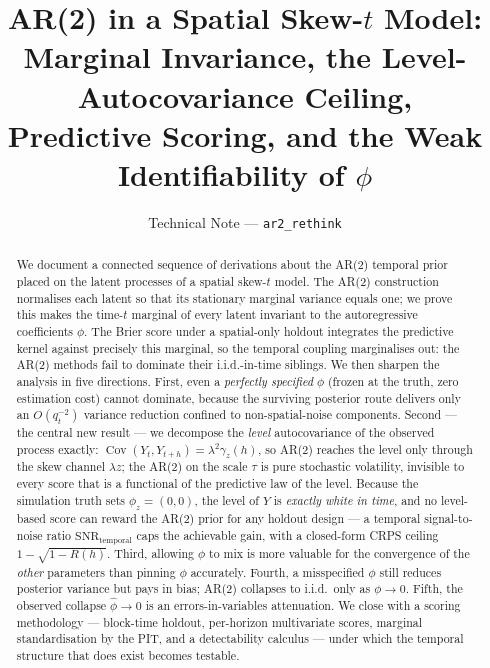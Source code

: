\documentclass[11pt]{article}
\title{
  AR(2) in a Spatial Skew-$t$ Model:\\
  Marginal Invariance, the Level-Autocovariance Ceiling,\\
  Predictive Scoring, and the Weak Identifiability of $\phi$
}
\author{Technical Note --- \texttt{ar2\_rethink}}
\date{}
\theoremstyle{definition}
\newcommand{\Cov}{\operatorname{Cov}}
\newcommand{\SNR}{\mathrm{SNR}_{\mathrm{temporal}}}
\begin{document}
\maketitle

\begin{abstract}
We document a connected sequence of derivations about the AR(2)
temporal prior placed on the latent processes of a spatial skew-$t$
model. The AR(2) construction normalises each latent so that its
stationary marginal variance equals one; we prove this makes the
time-$t$ marginal of every latent invariant to the autoregressive
coefficients $\phi$. The Brier score under a spatial-only holdout
integrates the predictive kernel against precisely this marginal, so
the temporal coupling marginalises out: the AR(2) methods fail to
dominate their i.i.d.-in-time siblings. We then sharpen the analysis in
five directions. First, even a \emph{perfectly specified} $\phi$
(frozen at the truth, zero estimation cost) cannot dominate, because
the surviving posterior route delivers only an $O(q_t^{-2})$ variance
reduction confined to non-spatial-noise components. Second --- the
central new result --- we decompose the \emph{level} autocovariance of
the observed process exactly: $\Cov(Y_t,Y_{t+h})=\lambda^2\gamma_z(h)$,
so AR(2) reaches the level only through the skew channel $\lambda z$;
the AR(2) on the scale $\tau$ is pure stochastic volatility, invisible
to every score that is a functional of the predictive law of the level.
Because the simulation truth sets $\phi_z=(0,0)$, the level of $Y$ is
\emph{exactly white in time}, and no level-based score can reward the
AR(2) prior for any holdout design --- a temporal signal-to-noise ratio
$\SNR$ caps the achievable gain, with a closed-form CRPS ceiling
$1-\sqrt{1-R(h)}$. Third, allowing $\phi$ to mix is more valuable for
the convergence of the \emph{other} parameters than pinning $\phi$
accurately. Fourth, a misspecified $\phi$ still reduces posterior
variance but pays in bias; AR(2) collapses to i.i.d.\ only as
$\phi\to0$. Fifth, the observed collapse $\hat\phi\to0$ is an
errors-in-variables attenuation. We close with a scoring methodology ---
block-time holdout, per-horizon multivariate scores, marginal
standardisation by the PIT, and a detectability calculus --- under which
the temporal structure that does exist becomes testable.
\end{abstract}

\end{document}
